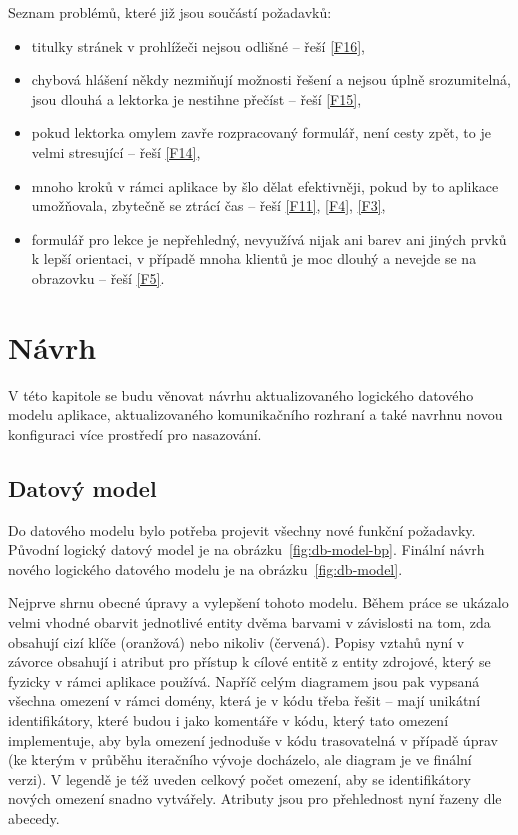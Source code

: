 Seznam problémů, které již jsou součástí požadavků:
\begin{itemize}
    \item titulky stránek v prohlížeči nejsou odlišné -- řeší \ref{F16},
    \item chybová hlášení někdy nezmiňují možnosti řešení a nejsou úplně srozumitelná, jsou dlouhá a lektorka je nestihne přečíst -- řeší \ref{F15},
    \item pokud lektorka omylem zavře rozpracovaný formulář, není cesty zpět, to je velmi stresující -- řeší \ref{F14},
    \item mnoho kroků v rámci aplikace by šlo dělat efektivněji, pokud by to aplikace umožňovala, zbytečně se ztrácí čas -- řeší \ref{F11}, \ref{F4}, \ref{F3},
    \item formulář pro lekce je nepřehledný, nevyužívá nijak ani barev ani jiných prvků k lepší orientaci, v případě mnoha klientů je moc dlouhý a nevejde se na obrazovku -- řeší \ref{F5}.
\end{itemize}

\chapter{Návrh}

V této kapitole se budu věnovat návrhu aktualizovaného logického datového modelu aplikace, aktualizovaného komunikačního rozhraní a také navrhnu novou konfiguraci více prostředí pro nasazování.


\section{Datový model}

Do datového modelu bylo potřeba projevit všechny nové funkční požadavky. Původní logický datový model je na obrázku~\ref{fig:db-model-bp}. Finální návrh nového logického datového modelu je na obrázku~\ref{fig:db-model}.

Nejprve shrnu obecné úpravy a vylepšení tohoto modelu. Během práce se ukázalo velmi vhodné obarvit jednotlivé entity dvěma barvami v závislosti na tom, zda obsahují cizí klíče (oranžová) nebo nikoliv (červená). Popisy vztahů nyní v závorce obsahují i atribut pro přístup k cílové entitě z entity zdrojové, který se fyzicky v rámci aplikace používá. Napříč celým diagramem jsou pak vypsaná všechna omezení v rámci domény, která je v kódu třeba řešit -- mají unikátní identifikátory, které budou i jako komentáře v kódu, který tato omezení implementuje, aby byla omezení jednoduše v kódu trasovatelná v případě úprav (ke kterým v průběhu iteračního vývoje docházelo, ale diagram je ve finální verzi). V legendě je též uveden celkový počet omezení, aby se identifikátory nových omezení snadno vytvářely. Atributy jsou pro přehlednost nyní řazeny dle abecedy.

